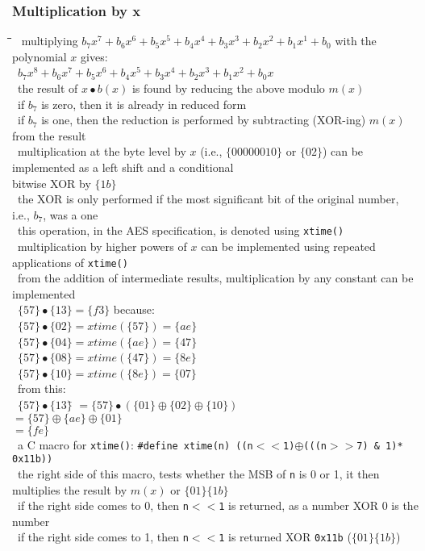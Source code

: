 \documentclass[10pt,letterpaper]{scrartcl}
\newcommand{\tbul}{\textbullet}
\newcommand{\tend}{\>\textendash}
\newcommand{\tasc}{\>\>\textasteriskcentered}
\newcommand{\tabDef}{\hspace{2em}\=\hspace{2em}\=\hspace{2em}\=\hspace{2em}\=\kill}
\begin{document}
\subsubsection*{Multiplication by x}\begin{tabbing}\tabDef 
\tbul\ multiplying $b_7x^7+b_6x^6+b_5x^5+b_4x^4+b_3x^3+b_2x^2+b_1x^1+b_0$ with the polynomial $x$ gives:  \\
\>\>\>\>\ $b_7x^8+b_6x^7+b_5x^6+b_4x^5+b_3x^4+b_2x^3+b_1x^2+b_0x$ \\
\tend\ the result of $x\bullet b(x)$ is found by reducing the above modulo $m(x)$ \\
\tend\ if $b_7$ is zero, then it is already in reduced form \\
\tend\ if $b_7$ is one, then the reduction is performed by subtracting (XOR-ing) $m(x)$ from the result \\
\tbul\ multiplication at the byte level by $x$ (i.e., $\{00000010\}$ or $\{02\}$) can be implemented as a left shift and a conditional\\ bitwise XOR by $\{1b\}$\\
\tend\ the XOR is only performed if the most significant bit of the original number, i.e., $b_7$, was a one \\
\tend\ this operation, in the AES specification, is denoted using \texttt{xtime()} \\
\tend\ multiplication by higher powers of $x$ can be implemented using repeated applications of \texttt{xtime()}\\
\tend\ from the addition of intermediate results, multiplication by any constant can be implemented \\ 
\>\>\>\>\ $\{57\}\bullet \{13\}=\{f3\}$ because: \\
\>\>\>\>\ $\{57\}\bullet \{02\}=xtime(\{57\})=\{ae\}$\\
\>\>\>\>\ $\{57\}\bullet \{04\}=xtime(\{ae\})=\{47\}$\\
\>\>\>\>\ $\{57\}\bullet \{08\}=xtime(\{47\})=\{8e\}$\\
\>\>\>\>\ $\{57\}\bullet \{10\}=xtime(\{8e\})=\{07\}$ \\
\tend\ from this: \\
\>\>\>\>\ $\{57\}\bullet \{13\}$\= $=\{57\}\bullet (\{01\}\oplus\{02\}\oplus\{10\})$ \\
\>\>\>\>\> $=\{57\}\oplus\{ae\}\oplus\{01\}$\\
\>\>\>\>\> $=\{fe\}$ \\                     
\tend\ a C macro for \texttt{xtime()}: \texttt{\#define xtime(n) ((n$<<$1)$\oplus$(((n$>>$7) \& 1)* 0x11b))} \\
\tasc\ the right side of this macro, tests whether the MSB of \texttt{n} is 0 or 1, it then multiplies the result by $m(x)$ or $\{01\}\{1b\}$ \\
\tasc\ if the right side comes to 0, then \texttt{n$<<$1} is returned, as a number XOR 0 is the number \\
\tasc\ if the right side comes to 1, then \texttt{n$<<$1} is returned XOR \texttt{0x11b} ($\{01\}\{1b\}$)\end{tabbing}
\end{document}
